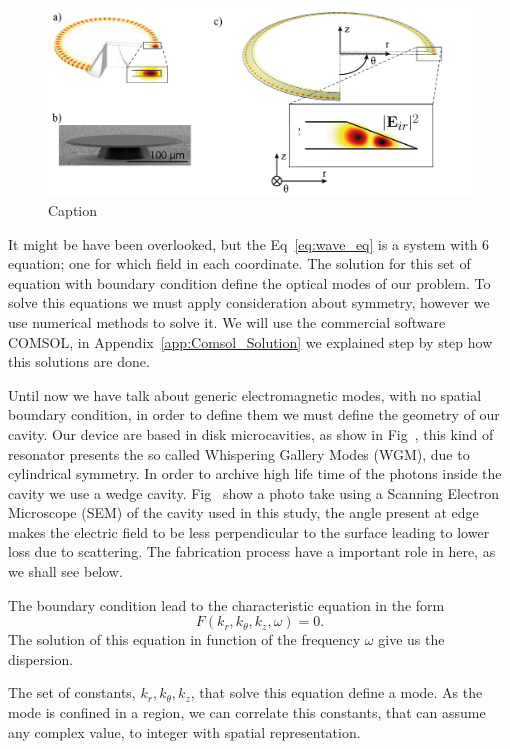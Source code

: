\begin{figure}[b!]
    \centering
    \includegraphics[width =16cm]{Dissertation_wgm.jpg}
    \caption{Caption}
    \label{fig:wgm}
\end{figure}
It might be have been overlooked, but the Eq~\ref{eq:wave_eq} is a system with 6 equation; one for which field in each coordinate. The solution for this set of equation with boundary condition define the optical modes of our problem. To solve this equations we must apply consideration about symmetry, however we use numerical methods to solve it. We will use the commercial software COMSOL\regmark, in Appendix~\ref{app:Comsol_Solution} we explained step by step how this solutions are done. 

Until now we have talk about generic electromagnetic modes, with no spatial boundary condition, in order to define them we must define the geometry of our cavity. Our device are based in disk microcavities, as show in Fig~, this kind of resonator presents the so called Whispering Gallery Modes (WGM), due to cylindrical symmetry. In order to archive high life time of the photons inside the cavity we use a wedge cavity. Fig~ show a photo take using a Scanning Electron Microscope (SEM) of the cavity used in this study, the angle present at edge makes the electric field to be less perpendicular to the surface leading to lower loss due to scattering\needcit. The fabrication process have a important role in here, as we shall see below. 

The boundary condition lead to the characteristic equation in the form 
\begin{equation}
    F(k_r,k_\theta,k_z,\omega) = 0.
    \label{eq:char_eq}
\end{equation}
The solution of this equation in function of the frequency $\omega$ give us the dispersion. 

The set of constants, $k_r,k_\theta,k_z$, that solve this equation define a mode. As the mode is confined in a region, we can correlate this constants, that can assume any complex value, to integer with spatial representation.

